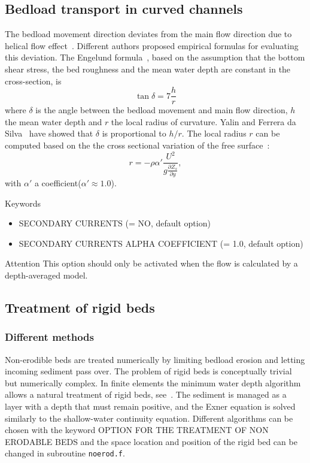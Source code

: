 \subsection{Bedload transport in curved channels}
The bedload movement direction deviates from the main flow direction due to helical flow effect~\cite{Wu}. Different authors proposed empirical formulas for evaluating this deviation. The Engelund formula~\cite{Engelund74}, based on the assumption that the bottom shear stress, the bed roughness and the mean water depth are constant in the cross-section, is
\begin{equation}
\tan \delta = 7\frac{h}{r}
\end{equation}
where $\delta$ is the angle between the bedload movement and main flow direction, $h$ the mean water depth and $r$ the local radius of curvature. Yalin and Ferrera da Silva~\cite{YalinFerrera} have showed that $\delta$ is proportional to $h/r$. The local radius $r$ can be computed based on the the cross sectional variation of the free surface~\cite{????}:
\begin{equation*}
r=-\rho\alpha'\frac{U^2}{g\frac{\partial Z_s}{\partial y}}, 
\end{equation*}
with $\alpha'$ a coefficient($\alpha' \approx 1.0$).

\medskip
\begin{bclogo}[couleur=blue!10,arrondi=0.1, logo=\bcinfo]{Keywords}
\begin{itemize}
\item {\ttfamily SECONDARY CURRENTS} ({\ttfamily = NO}, default option)
\item {\ttfamily SECONDARY CURRENTS ALPHA COEFFICIENT} ({\ttfamily = 1.0}, default option) 
\end{itemize}
\end{bclogo}

\begin{bclogo}[couleur = blue!10, arrondi = 0.10, logo = \bcattention]{\textsf{Attention}}
This option should only be activated when the flow is calculated by a depth-averaged model.
\end{bclogo}

\subsection{Treatment of rigid beds}
\subsubsection{Different methods}
Non-erodible beds are treated numerically by limiting bedload erosion and letting incoming sediment pass over. 
The problem of rigid beds is conceptually trivial but numerically complex. In finite elements the
minimum water depth algorithm allows a natural treatment of rigid
beds, see~\cite{Hervouet11}. The sediment is managed as a layer with a
depth that must remain positive, and the Exner equation is solved similarly to the shallow-water continuity equation.
Different algorithms can be chosen with the keyword {\ttfamily OPTION FOR THE TREATMENT OF NON ERODABLE BEDS} and the space location and position of the rigid bed can be changed in subroutine \texttt{noerod.f}.

